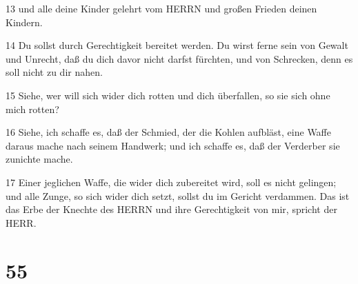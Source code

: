 \par 13 und alle deine Kinder gelehrt vom HERRN und großen Frieden deinen Kindern.
\par 14 Du sollst durch Gerechtigkeit bereitet werden. Du wirst ferne sein von Gewalt und Unrecht, daß du dich davor nicht darfst fürchten, und von Schrecken, denn es soll nicht zu dir nahen.
\par 15 Siehe, wer will sich wider dich rotten und dich überfallen, so sie sich ohne mich rotten?
\par 16 Siehe, ich schaffe es, daß der Schmied, der die Kohlen aufbläst, eine Waffe daraus mache nach seinem Handwerk; und ich schaffe es, daß der Verderber sie zunichte mache.
\par 17 Einer jeglichen Waffe, die wider dich zubereitet wird, soll es nicht gelingen; und alle Zunge, so sich wider dich setzt, sollst du im Gericht verdammen. Das ist das Erbe der Knechte des HERRN und ihre Gerechtigkeit von mir, spricht der HERR.

\chapter{55}

